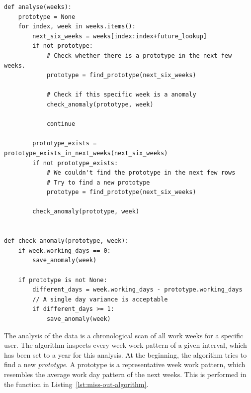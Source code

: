 \begin{verbatim}
def analyse(weeks):
    prototype = None
    for index, week in weeks.items():
        next_six_weeks = weeks[index:index+future_lookup]
        if not prototype:
            # Check whether there is a prototype in the next few weeks.
            prototype = find_prototype(next_six_weeks)

            # Check if this specific week is a anomaly
            check_anomaly(prototype, week)

            continue

        prototype_exists = prototype_exists_in_next_weeks(next_six_weeks)
        if not prototype_exists:
            # We couldn't find the prototype in the next few rows
            # Try to find a new prototype
            prototype = find_prototype(next_six_weeks)

        check_anomaly(prototype, week)


def check_anomaly(prototype, week):
    if week.working_days == 0:
        save_anomaly(week)

    if prototype is not None:
        different_days = week.working_days - prototype.working_days
        // A single day variance is acceptable
        if different_days >= 1:
            save_anomaly(week)

\end{verbatim}
\begingroup
{}\label{lst:miss-out-algorithm}
\endgroup

The analysis of the data is a chronological scan of all work weeks for a specific user.
The algorithm inspects every week work pattern of a given interval, which has been set to a year for this analysis.
At the beginning, the algorithm tries to find a new \emph{prototype}.
A prototype is a representative week work pattern, which resembles the average work day pattern of the next weeks.
This is performed in the function  in Listing~\ref{lst:miss-out-algorithm}.


